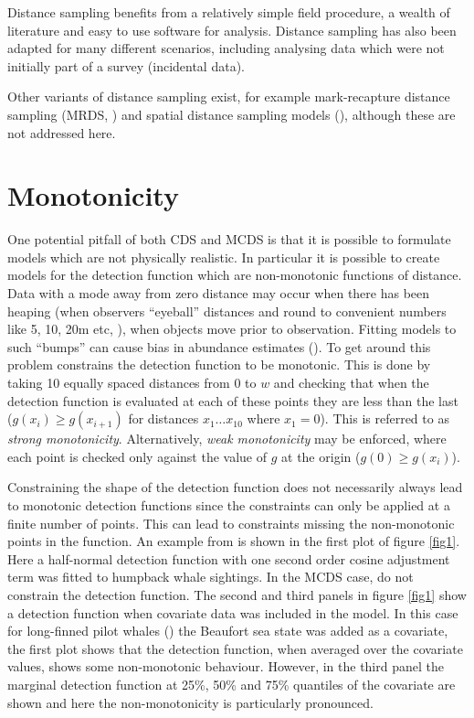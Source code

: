 Distance sampling benefits from a relatively simple field procedure, a wealth of literature and easy to use software for analysis. Distance sampling has also been adapted for many different scenarios, including analysing data which were\label{cor-r1-7} not initially part of a survey (incidental data).

Other variants of distance sampling exist, for example mark-recapture distance sampling (MRDS, \cite{mrdspaper}) and spatial distance sampling models (\cite[chapter 4]{ADS}), although these are not addressed here.

\section{Monotonicity}
\label{intro-ds-mono}
One potential pitfall of both CDS and MCDS is that  it is possible to formulate models which are not physically realistic. In particular it is possible to create models for the detection function which are non-monotonic functions of distance. Data with a mode away from zero distance may occur when there has been heaping (when observers ``eyeball'' distances and round to convenient numbers like 5, 10, 20m etc, \cite[pp. 34-35]{IDS}), when objects move prior to observation. Fitting models to such ``bumps'' can cause bias in abundance estimates (\cite[p. 132]{IDS}). To get around this problem  constrains the detection function to be monotonic. This is done by taking 10 equally spaced distances from $0$ to $w$ and checking that when the detection function is evaluated at each of these points they are less than the last ($g(x_i)\geq g(x_{i+1})$ for distances $x_1 \dots x_{10}$ where $x_1=0$). This is referred to as \textit{strong monotonicity}. Alternatively, \textit{weak monotonicity} may be enforced, where each point is checked only against the value of $g$ at the origin ($g(0)\geq g(x_i)$).

Constraining the shape of the detection function does not necessarily always lead to monotonic detection functions since the constraints can only be applied at a finite number of points. This can lead to constraints missing the non-monotonic points in the function. An example from  is shown in the first plot of figure \ref{fig1}. Here a half-normal detection function with one second order cosine adjustment term was fitted to humpback whale sightings. In the MCDS case,  do not constrain the detection function. The second and third panels in figure \ref{fig1} show a detection function when covariate data was included in the model. In this case for long-finned pilot whales (\cite{pike}) the Beaufort sea state was added as a covariate, the first plot shows that the detection function, when averaged over the covariate values, shows some non-monotonic behaviour. However, in the third panel the marginal detection function at 25\%, 50\% and 75\% quantiles of the covariate are shown and here the non-monotonicity is particularly pronounced. 

